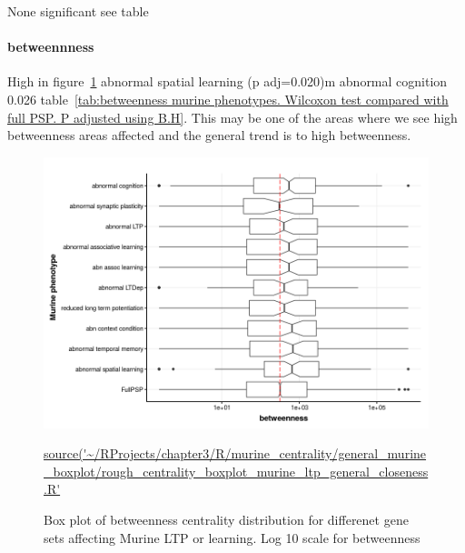 None significant see table



\paragraph{betweennness}

High in figure~\ref{fig:murine_ltp_centrality_boxplot_betweenness} abnormal spatial learning (p adj=0.020)m  abnormal cognition 0.026 table~\ref{tab:betweenness murine phenotypes. Wilcoxon test compared with full PSP. P adjusted using B.H}. This may be one of the areas where we see high betweenness areas affected and the general trend is to high betweenness.
\begin{figure}
    \centering
    \includegraphics[width=\textwidth]{images/chapter3/ggplot2/murine_centrality_boxplot/add_theme/addLTP/Rplot_betweenness_edit.png}
    \caption{Box plot of betweenness centrality distribution for differenet gene sets affecting Murine LTP or learning. Log 10 scale for betweenness} 
    \tiny\url{source('~/RProjects/chapter3/R/murine_centrality/general_murine_boxplot/rough_centrality_boxplot_murine_ltp_general_closeness.R'}
    \label{fig:murine_ltp_centrality_boxplot_betweenness}
\end{figure}

